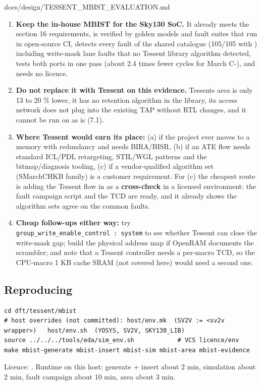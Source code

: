 \begin{relocated}{docs/design/TESSENT_MBIST_EVALUATION.md}
\begin{enumerate}
\def\labelenumi{\arabic{enumi}.}
\tightlist
\item
  \textbf{Keep the in-house MBIST for the Sky130 SoC.} It already meets
  the section 16 requirements, is verified by golden models and fault
  suites that run in open-source CI, detects every fault of the shared
  catalogue (105/105 with ) including write-mask lane faults
  that no Tessent library algorithm detected, tests both ports in one
  pass (about 2.4 times fewer cycles for March C-), and needs no
  licence.
\item
  \textbf{Do not replace it with Tessent on this evidence.}
  Tessent\textquotesingle s area is only 13 to 20 \% lower, it has no
  retention algorithm in the library, its access network does not plug
  into the existing TAP without RTL changes, and it cannot be run on
   as is (7.1).
\item
  \textbf{Where Tessent would earn its place:} (a) if the project ever
  moves to a memory with redundancy and needs BIRA/\allowbreak{}BISR,
  (b) if an ATE flow needs standard ICL/PDL retargeting, STIL/WGL
  patterns and the bitmap/\allowbreak{}diagnosis tooling, (c) if a
  vendor-qualified algorithm set (SMarchCHKB family) is a customer
  requirement. For (c) the cheapest route is adding the Tessent flow in
   as a \textbf{cross-check} in a licensed
  environment: the fault campaign script and the TCD are ready, and it
  already shows the algorithm sets agree on the common faults.
\item
  \textbf{Cheap follow-ups either way:} try
  \texttt{group\_\allowbreak{}write\_\allowbreak{}enable\_\allowbreak{}control\ :\allowbreak{}\ system}
  to see whether Tessent can close the write-mask gap; build the
  physical address map if OpenRAM documents the scrambler; and note that
  a Tessent controller needs a per-macro TCD, so the CPU-macro 1 KB
  cache SRAM (not covered here) would need a second one.
\end{enumerate}

\subsection{Reproducing}\label{tm:dec:tessent-mbist-evaluation:10-reproducing}

\begin{lstlisting}[language={}]
cd dft/tessent/mbist
# host overrides (not committed): host/env.mk  (SV2V := <sv2v wrapper>)   host/env.sh  (YOSYS, SV2V, SKY130_LIB)
source ../../../tools/eda/sim_env.sh            # VCS licence/env
make mbist-generate mbist-insert mbist-sim mbist-area mbist-evidence
\end{lstlisting}

Licence: . Runtime on this host:
generate + insert about 2 min, simulation about 2 min, fault campaign
about 10 min, area about 3 min.
\end{relocated}

